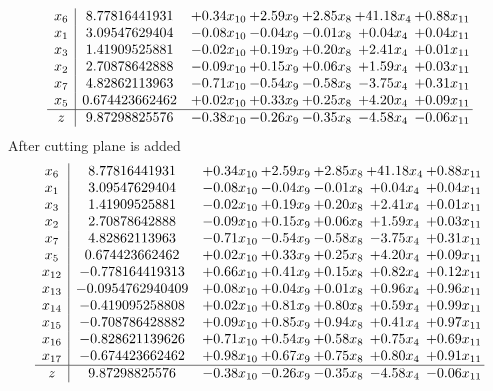 \documentclass[8pt]{article}
\begin{document}
\[\begin{array}{c| c c@{\hskip 2pt} c@{\hskip 2pt} c@{\hskip 2pt} c@{\hskip 2pt} c@{\hskip 2pt} }
 x_{6}   &  8.77816441931 & +  0.34 x_{10} & +  2.59 x_{9} & +  2.85 x_{8} & + 41.18 x_{4} & +  0.88 x_{11}\\
 x_{1}   &  3.09547629404 & -0.08 x_{10} & -0.04 x_{9} & -0.01 x_{8} & +  0.04 x_{4} & +  0.04 x_{11}\\
 x_{3}   &  1.41909525881 & -0.02 x_{10} & +  0.19 x_{9} & +  0.20 x_{8} & +  2.41 x_{4} & +  0.01 x_{11}\\
 x_{2}   &  2.70878642888 & -0.09 x_{10} & +  0.15 x_{9} & +  0.06 x_{8} & +  1.59 x_{4} & +  0.03 x_{11}\\
 x_{7}   &  4.82862113963 & -0.71 x_{10} & -0.54 x_{9} & -0.58 x_{8} & -3.75 x_{4} & +  0.31 x_{11}\\
 x_{5}   &  0.674423662462 & +  0.02 x_{10} & +  0.33 x_{9} & +  0.25 x_{8} & +  4.20 x_{4} & +  0.09 x_{11}\\
\hline
z    &  9.87298825576 & -0.38 x_{10} & -0.26 x_{9} & -0.35 x_{8} & -4.58 x_{4} & -0.06 x_{11}\\
\end{array}\]
 After cutting plane is added 
\[\begin{array}{c| c c@{\hskip 2pt} c@{\hskip 2pt} c@{\hskip 2pt} c@{\hskip 2pt} c@{\hskip 2pt} }
 x_{6}   &  8.77816441931 & +  0.34 x_{10} & +  2.59 x_{9} & +  2.85 x_{8} & + 41.18 x_{4} & +  0.88 x_{11}\\
 x_{1}   &  3.09547629404 & -0.08 x_{10} & -0.04 x_{9} & -0.01 x_{8} & +  0.04 x_{4} & +  0.04 x_{11}\\
 x_{3}   &  1.41909525881 & -0.02 x_{10} & +  0.19 x_{9} & +  0.20 x_{8} & +  2.41 x_{4} & +  0.01 x_{11}\\
 x_{2}   &  2.70878642888 & -0.09 x_{10} & +  0.15 x_{9} & +  0.06 x_{8} & +  1.59 x_{4} & +  0.03 x_{11}\\
 x_{7}   &  4.82862113963 & -0.71 x_{10} & -0.54 x_{9} & -0.58 x_{8} & -3.75 x_{4} & +  0.31 x_{11}\\
 x_{5}   &  0.674423662462 & +  0.02 x_{10} & +  0.33 x_{9} & +  0.25 x_{8} & +  4.20 x_{4} & +  0.09 x_{11}\\
 x_{12}   &  -0.778164419313 & +  0.66 x_{10} & +  0.41 x_{9} & +  0.15 x_{8} & +  0.82 x_{4} & +  0.12 x_{11}\\
 x_{13}   &  -0.0954762940409 & +  0.08 x_{10} & +  0.04 x_{9} & +  0.01 x_{8} & +  0.96 x_{4} & +  0.96 x_{11}\\
 x_{14}   &  -0.419095258808 & +  0.02 x_{10} & +  0.81 x_{9} & +  0.80 x_{8} & +  0.59 x_{4} & +  0.99 x_{11}\\
 x_{15}   &  -0.708786428882 & +  0.09 x_{10} & +  0.85 x_{9} & +  0.94 x_{8} & +  0.41 x_{4} & +  0.97 x_{11}\\
 x_{16}   &  -0.828621139626 & +  0.71 x_{10} & +  0.54 x_{9} & +  0.58 x_{8} & +  0.75 x_{4} & +  0.69 x_{11}\\
 x_{17}   &  -0.674423662462 & +  0.98 x_{10} & +  0.67 x_{9} & +  0.75 x_{8} & +  0.80 x_{4} & +  0.91 x_{11}\\
\hline
z    &  9.87298825576 & -0.38 x_{10} & -0.26 x_{9} & -0.35 x_{8} & -4.58 x_{4} & -0.06 x_{11}\\
\end{array}\]
\end{document}
